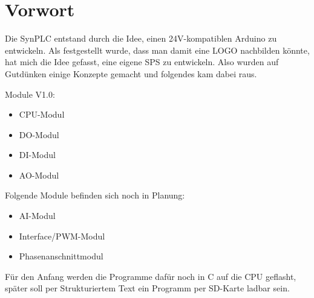 \chapter{Vorwort}
Die SynPLC entstand durch die Idee, einen 24V-kompatiblen Arduino zu entwickeln. Als festgestellt wurde, dass man damit eine LOGO nachbilden könnte, hat mich die Idee gefasst, eine eigene SPS zu entwickeln. 
Also wurden auf Gutdünken einige Konzepte gemacht und folgendes kam dabei raus.

Module V1.0: 
\begin{itemize}
    \item CPU-Modul
    \item DO-Modul
    \item DI-Modul
    \item AO-Modul
\end{itemize}

Folgende Module befinden sich noch in Planung:
\begin{itemize}
    \item AI-Modul
    \item Interface/PWM-Modul
    \item Phasenanschnittmodul
\end{itemize}

Für den Anfang werden die Programme dafür noch in C auf die CPU geflasht, später soll per Strukturiertem Text ein Programm per SD-Karte ladbar sein.
